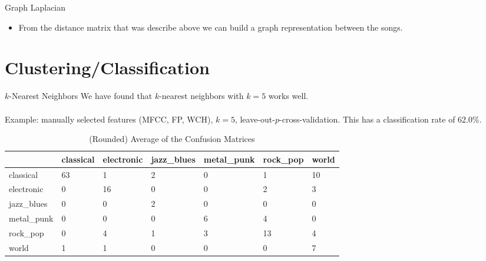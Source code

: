 \documentclass[xcolor=dvipsnames,t]{beamer} %
\begin{document}
\begin{frame}{Graph Laplacian}
\begin{itemize}
\item From the distance matrix that was describe above we can build a graph representation between the songs. 
\end{itemize}
\end{frame}



\section{Clustering/Classification}
\begin{frame}[shrink=20]{$k$-Nearest Neighbors}
   We have found that $k$-nearest neighbors with $k=5$ works well.\\

   ~\\
   Example: manually selected features (MFCC, FP, WCH), $k=5$, leave-out-$p$-cross-validation.  This has a classification rate of $62.0\%$.

   \begin{table}[h!]
      \centering
      \begin{tabular}{ l||l | l | l | l | l | l | }
      & classical & electronic & jazz\_blues & metal\_punk & rock\_pop & world\\\hline
      classical & 63 &1 &2 &0 &1 &10 \\ \hline 
      electronic & 0 &16 &0 &0 &2 &3 \\ \hline 
      jazz\_blues & 0 &0 &2 &0 &0 &0 \\ \hline 
      metal\_punk & 0 &0 &0 &6 &4 &0 \\ \hline 
      rock\_pop & 0 &4 &1 &3 &13 &4 \\ \hline 
      world & 1 &1 &0 &0 &0 &7 \\ \hline 
      \end{tabular}
      \caption{(Rounded) Average of the Confusion Matrices}
   \end{table}

\end{frame}
\end{document}

